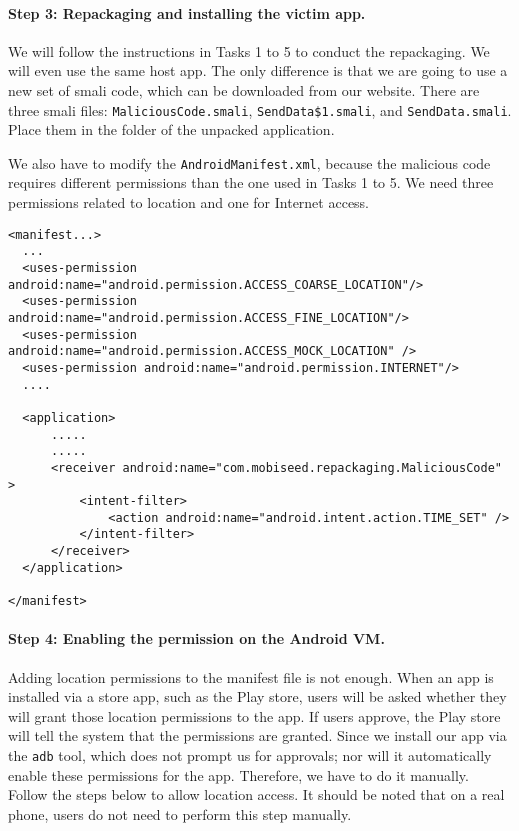 \paragraph{Step 3: Repackaging and installing the victim app.}
We will follow the instructions in Tasks 1 to 5 to 
conduct the repackaging. We will even use the same host app. 
The only difference is that we are going to use a
new set of smali code, which can be downloaded from our website.  
There are three smali files: \texttt{MaliciousCode.smali}, 
\texttt{SendData\$1.smali}, and \texttt{SendData.smali}.
Place them in the  folder of 
the unpacked application.


We also have to modify the \texttt{AndroidManifest.xml}, because the 
malicious code requires different permissions than the one used in Tasks 1
to 5. We need three permissions related to location and one for Internet
access. 

\begin{lstlisting}
<manifest...>
  ...
  <uses-permission android:name="android.permission.ACCESS_COARSE_LOCATION"/> 
  <uses-permission android:name="android.permission.ACCESS_FINE_LOCATION"/> 
  <uses-permission android:name="android.permission.ACCESS_MOCK_LOCATION" /> 
  <uses-permission android:name="android.permission.INTERNET"/>
  ....

  <application>
      .....
      .....
      <receiver android:name="com.mobiseed.repackaging.MaliciousCode" >
          <intent-filter>
              <action android:name="android.intent.action.TIME_SET" />
          </intent-filter>
      </receiver>
  </application>

</manifest>
\end{lstlisting}


\paragraph{Step 4: Enabling the permission on the Android VM.} 
Adding location permissions to the manifest file is not enough. When an app is
installed via a store app, such as the Play store, users will be asked
whether they will grant those location permissions to the app. If users
approve, the Play store will tell the system that the permissions are
granted. Since we install our app via the \texttt{adb} tool, which does not
prompt us for approvals; nor will it automatically 
enable these permissions for the app. Therefore, we have to do it manually.
Follow the steps below to allow location access.  It should be noted that 
on a real phone, users do not need to perform this step manually. 

